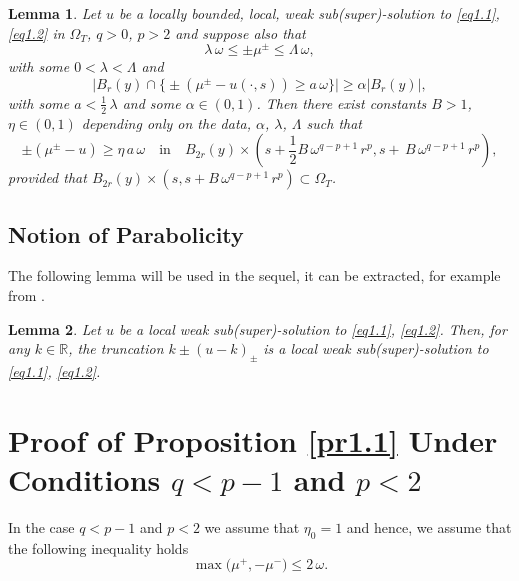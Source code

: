 \documentclass[a4paper,11pt,fullpage]{article}
\numberwithin{equation}{section}
\newtheorem{lemma}{Lemma}[section]
\begin{document}
 \begin{lemma}\label{lem2.7}
 Let $u$ be a locally bounded, local, weak sub(super)-solution to \eqref{eq1.1}, \eqref{eq1.2} in $\Omega_T$, $q>0$, $p>2$ and suppose also 
that
\begin{equation}\label{eq2.16}
\lambda\,\omega \leqslant \pm \mu^{\pm}\leqslant \Lambda\,\omega,
\end{equation}
with some $0<\lambda <\Lambda$ and
\begin{equation}\label{eq2.17}
\big|B_r(y)\cap\big\{\pm(\mu^{\pm}-u(\cdot, s))\geqslant a\,\omega\big\}\big|\geqslant \alpha |B_r(y)|,
\end{equation}
with some $a<\frac{1}{2}\,\lambda$ and some $\alpha \in (0, 1)$. Then there exist constants $B>1$, $\eta \in (0, 1)$ depending
only on the data,  $\alpha$, $\lambda$, $\Lambda$ such that
\begin{equation}\label{eq2.18}
\pm(\mu^{\pm}-u)\geqslant \eta\,a\,\omega \quad \text{in}\quad  B_{2r}(y)\times (s+\frac{1}{2} B\,\omega^{q-p+1}\,r^p, s+\,B\,\omega^{q-p+1}\,r^p),
\end{equation}
provided that $B_{2r}(y)\times (s, s+ B\,\omega^{q-p+1}\,r^p)\subset \Omega_T$.
 \end{lemma}

 \subsection{Notion of Parabolicity}
The following lemma will be used in the sequel, it can be extracted, for example from \cite{Bog2}.
\begin{lemma}\label{lem2.8}
Let $u$ be a local weak sub(super)-solution to \eqref{eq1.1}, \eqref{eq1.2}. Then, for any
$k\in \mathbb{R}$, the truncation $k\pm (u-k)_{\pm}$ is a local weak sub(super)-solution to \eqref{eq1.1}, \eqref{eq1.2}.
 \end{lemma}


\section{Proof of Proposition \ref{pr1.1} Under Conditions $q<p-1$ and $p<2$}

In the case $q<p-1$ and $p<2$ we assume that $\eta_0=1$ and hence, we assume that the following inequality holds
\begin{equation}\label{eq3.1}
\max\big(\mu^+, -\mu^-\big)\leqslant 2\,\omega.
\end{equation} 
\end{document}
